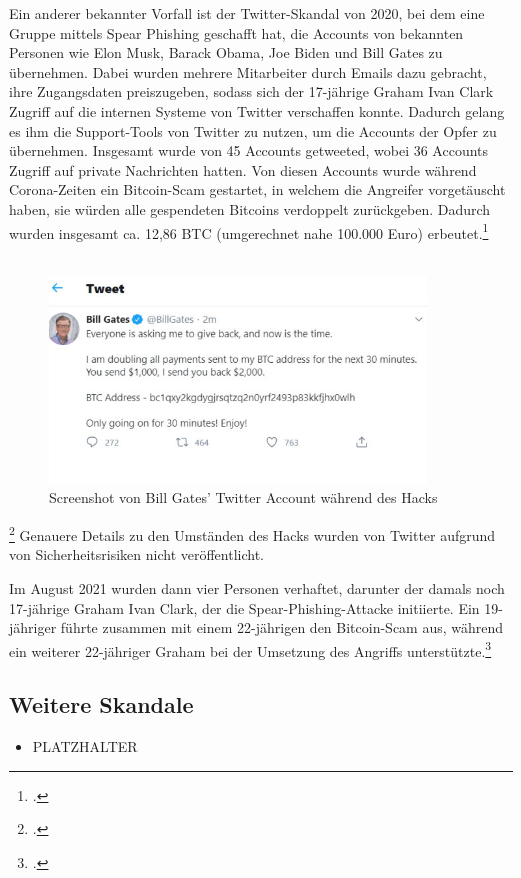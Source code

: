 \documentclass[12pt, a4paper, oneside]{scrartcl}
\begin{document}
Ein anderer bekannter Vorfall ist der Twitter-Skandal von 2020, bei dem eine Gruppe mittels Spear Phishing geschafft
hat, die Accounts von bekannten Personen wie Elon Musk, Barack Obama, Joe Biden und Bill Gates zu übernehmen.
Dabei wurden mehrere Mitarbeiter durch Emails dazu gebracht, ihre Zugangsdaten preiszugeben, sodass sich 
der 17-jährige Graham Ivan Clark Zugriff auf die internen Systeme von Twitter verschaffen konnte. Dadurch gelang
es ihm die Support-Tools von Twitter zu nutzen, um die Accounts der Opfer zu übernehmen. Insgesamt wurde von 45 Accounts
getweeted, wobei 36 Accounts Zugriff auf private Nachrichten hatten. Von diesen Accounts wurde während Corona-Zeiten 
ein Bitcoin-Scam gestartet, in welchem die Angreifer vorgetäuscht haben, sie würden alle gespendeten Bitcoins verdoppelt
zurückgeben. Dadurch wurden insgesamt ca. 12,86 BTC (umgerechnet nahe 100.000 Euro) erbeutet.\footcite{teampw_TwitterPhishing}\\\\

\begin{figure}[h!]
  \centering
  \includegraphics[width=10cm]{bill_hack.png}
  \caption[Screenshot von Bill Gates' Twitter Account während des Hacks]{Screenshot von Bill Gates' Twitter Account während des Hacks\footnotemark}
\end{figure}
\footcitetext{PicTwitterHack}
Genauere Details zu den Umständen des Hacks wurden von Twitter aufgrund von Sicherheitsrisiken nicht veröffentlicht. 
\par
Im August 2021 wurden dann vier Personen verhaftet, darunter der damals noch 17-jährige Graham Ivan Clark, 
der die Spear-Phishing-Attacke initiierte. Ein 19-jähriger führte zusammen mit einem 22-jährigen den 
Bitcoin-Scam aus, während ein weiterer 22-jähriger Graham bei der Umsetzung des Angriffs unterstützte.\footcite{teampw_TwitterPhishing}


\subsection{Weitere Skandale}
\begin{itemize}
  \item PLATZHALTER
\end{itemize}
\end{document}
